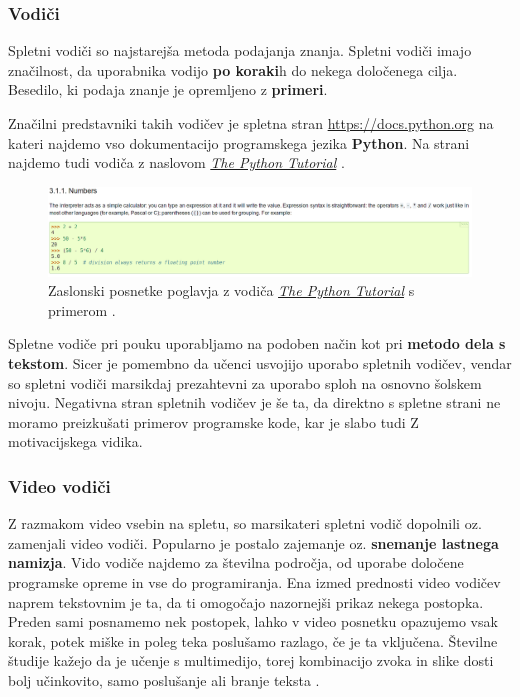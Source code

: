 
\subsubsection{Vodiči}

Spletni vodiči so najstarejša metoda podajanja znanja. Spletni vodiči
imajo značilnost, da uporabnika vodijo \textbf{po koraki}h do nekega
določenega cilja. Besedilo, ki podaja znanje je opremljeno z
\textbf{primeri}. \cite{wiki:tutorials}

Značilni predstavniki takih vodičev je spletna stran
\url{https://docs.python.org} na kateri najdemo vso dokumentacijo
programskega jezika \textbf{Python}. Na strani najdemo tudi vodiča z
naslovom \emph{\href{https://docs.python.org/3/tutorial/index.html}{The
  Python Tutorial}} \cite{web:TPythonTut The}.

\begin{figure}[h]
    \includegraphics [width=1\linewidth, keepaspectratio =
    1] {./images/sc_web/tPyTut_01.png}
    \caption{Zaslonski posnetke poglavja z vodiča
      \emph{\href{https://docs.python.org/3/tutorial/index.html}{The
          Python Tutorial}} s primerom \cite{web:TPythonTut}.}
    \label{fig:scr:web:tPyTut}
\end{figure}

Spletne vodiče pri pouku uporabljamo na podoben način kot pri
\textbf{metodo dela s tekstom}. Sicer je pomembno da učenci usvojijo
uporabo spletnih vodičev, vendar so spletni vodiči marsikdaj
prezahtevni za uporabo sploh na osnovno šolskem nivoju. Negativna
stran spletnih vodičev je še ta, da direktno s spletne strani ne
moramo preizkušati primerov programske kode, kar je slabo tudi Z
motivacijskega vidika.

\subsubsection{Video vodiči}
\label{sec:video_vodici}

Z razmakom video vsebin na spletu, so marsikateri spletni vodič
dopolnili oz. zamenjali video vodiči. Popularno je postalo zajemanje
oz. \textbf{snemanje lastnega namizja}. Vido vodiče najdemo za
številna področja, od uporabe določene programske opreme in vse do
programiranja. Ena izmed prednosti video vodičev naprem tekstovnim je
ta, da ti omogočajo nazornejši prikaz nekega postopka. Preden sami
posnamemo nek postopek, lahko v video posnetku opazujemo vsak korak,
potek miške in poleg teka poslušamo razlago, če je ta vključena.
Številne študije kažejo da je učenje s multimedijo, torej kombinacijo
zvoka in slike dosti bolj učinkovito, samo poslušanje ali branje
teksta \cite{web:multimediaL}.

